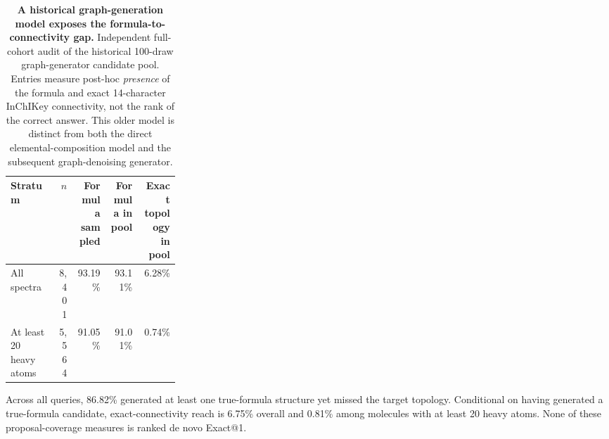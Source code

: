\begin{table}[!htbp]
\centering
\caption{\textbf{A historical graph-generation model exposes the formula-to-connectivity gap.} Independent full-cohort audit of the historical 100-draw graph-generator candidate pool. Entries measure post-hoc \emph{presence} of the formula and exact 14-character InChIKey connectivity, not the rank of the correct answer. This older model is distinct from both the direct elemental-composition model and the subsequent graph-denoising generator.}
\label{tab:msdev_topology}
\small
\setlength{\tabcolsep}{4pt}
\begin{tabular}{p{0.28\linewidth}rrrr}
\toprule
Stratum & $n$ & Formula sampled & Formula in pool & Exact topology in pool \\
\midrule
All spectra & 8,401 & 93.19\% & 93.11\% & 6.28\% \\
At least 20 heavy atoms & 5,564 & 91.05\% & 91.01\% & 0.74\% \\
\bottomrule
\end{tabular}
\vspace{3pt}
\begin{minipage}{0.97\linewidth}\footnotesize
Across all queries, 86.82\% generated at least one true-formula structure yet missed the target topology. Conditional on having generated a true-formula candidate, exact-connectivity reach is 6.75\% overall and 0.81\% among molecules with at least 20 heavy atoms. None of these proposal-coverage measures is ranked de novo Exact@1.
\end{minipage}
\end{table}

